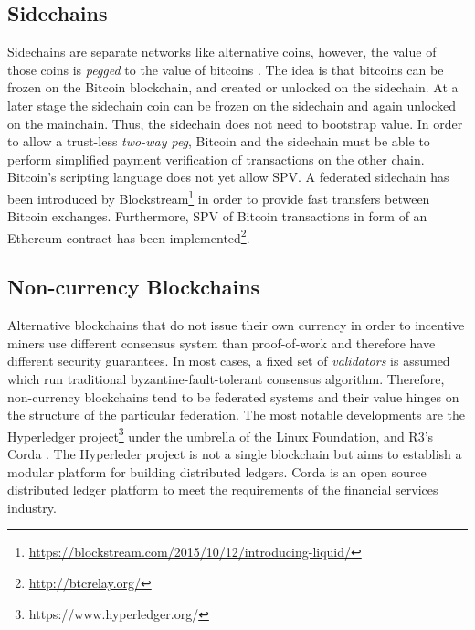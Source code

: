 \subsection{Sidechains}
Sidechains are separate networks like alternative coins, however, the value of those coins is \emph{pegged} to the value of bitcoins \parencite{backenabling}. The idea is that bitcoins can be frozen on the Bitcoin blockchain, and created or unlocked on the sidechain. At a later stage the sidechain coin can be frozen on the sidechain and again unlocked on the mainchain. Thus, the sidechain does not need to bootstrap value.
In order to allow a trust-less \emph{two-way peg}, Bitcoin and the sidechain must be able to perform simplified payment verification of transactions on the other chain. Bitcoin's scripting language does not yet allow \ac{SPV}. A federated sidechain has been introduced by Blockstream\footnote{\url{https://blockstream.com/2015/10/12/introducing-liquid/}} in order to provide fast transfers between Bitcoin exchanges. Furthermore, \ac{SPV} of Bitcoin transactions in form of an Ethereum contract has been implemented\footnote{\url{http://btcrelay.org/}}.

\subsection{Non-currency Blockchains}

Alternative blockchains that do not issue their own currency in order to incentive miners use different consensus system than proof-of-work and therefore have different security guarantees. In most cases, a fixed set of \emph{validators} is assumed which run traditional byzantine-fault-tolerant consensus algorithm. Therefore, non-currency blockchains tend to be federated systems and their value hinges on the structure of the particular federation. The most notable developments are the Hyperledger project\footnote{https://www.hyperledger.org/} under the umbrella of the Linux Foundation, and R3's Corda \parencite{Brown2016corda}. The Hyperleder project is not a single blockchain but aims to establish a modular platform for building distributed ledgers. Corda is an open source distributed ledger platform to meet the requirements of the financial services industry.



